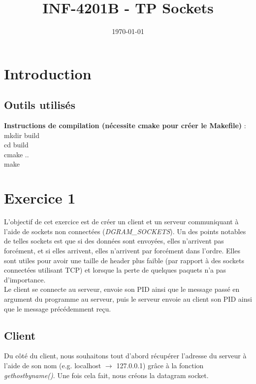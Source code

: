 \documentclass[a4paper, frenchb, 11pt]{article}
\title{
	\textbf{INF-4201B - TP Sockets}\\
}
\date{\today}
\begin{document}
\maketitle
\newpage


\section{Introduction}

\subsection{Outils utilisés}

\begin{mdframed}[backgroundcolor=lightblue, linecolor=darkblue]
	\textbf{Instructions de compilation (nécessite cmake pour créer le Makefile)} :\\
	mkdir build\\
	cd build\\
	cmake ..\\
	make
\end{mdframed}
\newpage

\section{Exercice 1}
L'objectif de cet exercice est de créer un client et un serveur communiquant à l'aide de sockets non connectées (\emph{DGRAM\_SOCKETS}). Un des points notables de telles sockets est que si des données sont envoyées, elles n'arrivent pas forcément, et si elles arrivent, elles n'arrivent par forcément dans l'ordre. Elles sont utiles pour avoir une taille de header plus faible (par rapport à des sockets connectées utilisant TCP) et lorsque la perte de quelques paquets n'a pas d'importance.\\ %

Le client se connecte au serveur, envoie son PID ainsi que le message passé en argument du programme au serveur, puis le serveur envoie au client son PID ainsi que le message précédemment reçu.

\subsection{Client}
Du côté du client, nous souhaitons tout d'abord récupérer l'adresse du serveur à l'aide de son nom (e.g. localhost $\rightarrow$ 127.0.0.1) grâce à la fonction \emph{gethostbyname()}. Une fois cela fait, nous créons la datagram socket.\\
\end{document}
